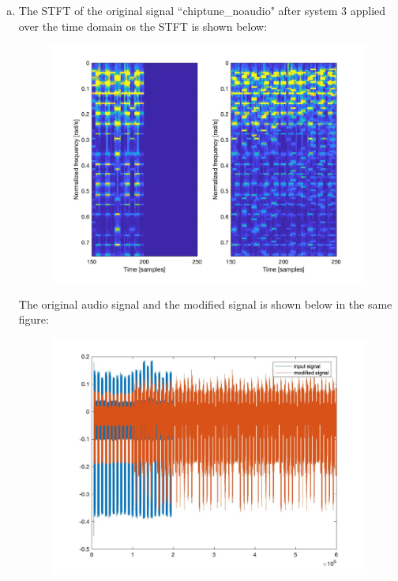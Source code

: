 \documentclass[a4paper]{article}
\begin{document}
\begin{spacing}{2.0}
\begin{enumerate}[(a)]
\item The STFT of the original signal ``chiptune\_noaudio" after system 3 applied over the time domain os the STFT is shown below:
\begin{figure}[H]
\centering
\includegraphics[width=5in]{3c.jpg}
\label{fig:graph}
\end{figure}
The original audio signal and the modified signal is shown below in the same figure:
\begin{figure}[H]
\centering
\includegraphics[width=5in]{3c_audio.jpg}
\label{fig:graph}
\end{figure}


\end{enumerate}


\end{spacing}
\end{document}
